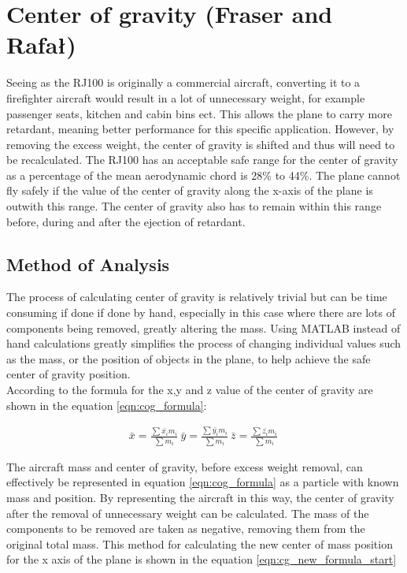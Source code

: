 \section{Center of gravity (Fraser and Rafał)}

Seeing as the RJ100 is originally a commercial aircraft, converting it to a firefighter aircraft would result in a lot of unnecessary weight, 
for example passenger seats, kitchen and cabin bins ect.
This allows the plane to carry more retardant, meaning better performance for this specific application.
However, by removing the excess weight, the center of gravity is shifted and thus will need to be recalculated.
The RJ100 has an acceptable safe range for the center of gravity as a percentage of the mean aerodynamic chord is 28\% to 44\%.
The plane cannot fly safely if the value of the center of gravity along the x-axis of the plane is outwith this range.
The center of gravity also has to remain within this range before, during and after the ejection of retardant.

\subsection{Method of Analysis}
The process of calculating center of gravity is relatively trivial but can be time consuming if done if done by hand,
especially in this case where there are lots of components being removed, greatly altering the mass.
Using MATLAB instead of hand calculations greatly simplifies the process of changing individual values such as the mass, or the position of objects in the plane, to help achieve the safe center of gravity position. \\ 

According to \cite{baker2020engineering} the formula for the x,y and z value of the center of gravity are shown in the equation \ref{eqn:cog_formula}:

\begin{equation}
\begin{split}
  \bar{x} = \frac{\sum{ \bar{x_{i}} m_{i} }}{ \sum{ m_{i}}} \
  \bar{y} = \frac{\sum{ \bar{y_{i}} m_{i} }}{ \sum{ m_{i}}} \
  \bar{z} = \frac{\sum{ \bar{z_{i}} m_{i} }}{ \sum{ m_{i}}} \
\end{split}
\label{eqn:cog_formula}
\end{equation}

The aircraft mass and center of gravity, before excess weight removal, can effectively be represented in equation \ref{eqn:cog_formula} as a particle with known mass and position.
By representing the aircraft in this way, the center of gravity after the removal of unnecessary weight can be calculated.
The mass of the components to be removed are taken as negative, removing them from the original total mass.
This method for calculating the new center of mass position for the x axis of the plane is shown in the equation \ref{eqn:cg_new_formula_start}


